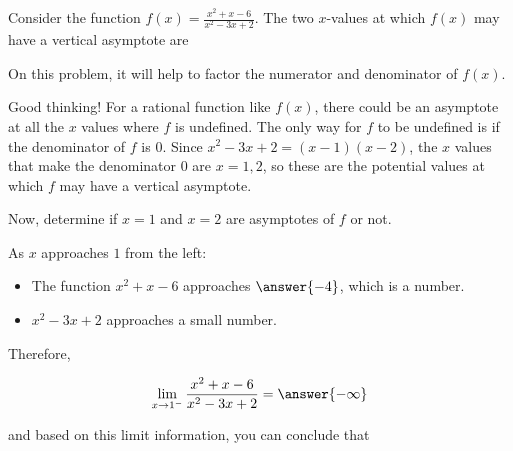 \documentclass[handout]{ximera}
\begin{document}
\begin{exercise}

Consider the function $f(x) = \frac{x^2+x-6}{x^2-3x+2}$.  The two $x$-values at which $f(x)$ may have a vertical asymptote are

\begin{hint}
On this problem, it will help to factor the numerator and denominator of $f(x)$.

\end{hint}

\begin{multipleChoice}
    
    \begin{feedback}[correct]
    Good thinking!  For a rational function like $f(x)$, there could be an asymptote at all the $x$ values where $f$ is undefined.  The only way for $f$ to be undefined is if the denominator of $f$ is 0.  Since $x^2 -3x + 2 = (x-1)(x-2)$, the $x$ values that make the denominator 0 are $x = 1, 2$, so these are the potential values at which $f$ may have a vertical asymptote. 
    \end{feedback}
\end{multipleChoice}
    
\begin{exercise}
Now, determine if $x = 1$ and $x = 2$ are asymptotes of $f$ or not. 

As $x$ approaches $1$ from the left:  

\begin{itemize}

\item The function $x^2 + x -6$ approaches $\answer{-4}$, which is a  number. 

\item $x^2 - 3x + 2$ approaches a small  number.

\end{itemize}

Therefore, 

\[ \displaystyle\lim_{x \to 1^-} \frac{x^2+x-6}{x^2-3x+2} = \answer{-\infty} \]

and based on this limit information, you can conclude that

\begin{multipleChoice}
\end{multipleChoice}


\end{exercise}
\end{exercise}
\end{document}
